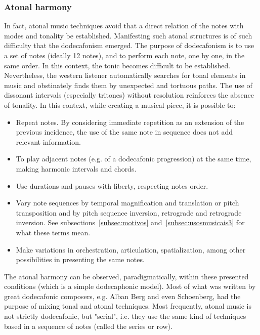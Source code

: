 \subsubsection{Atonal harmony}
In fact, atonal music techniques avoid that a direct relation of the notes with modes and tonality be established. Manifesting such atonal structures is of such difficulty that the dodecafonism emerged. The purpose of dodecafonism is to use a set of notes (ideally 12 notes), and to perform each note, one by one, in the same
order. In this context, the tonic becomes difficult to be established. Nevertheless, the western listener automatically searches for tonal elements in music and obstinately finds them by unexpected and tortuous paths. The use of dissonant intervals (especially tritones) without resolution reinforces the absence of tonality. In this context, while creating a musical
piece, it is possible to:
\begin{itemize}
     \item Repeat notes. By considering immediate repetition as an extension of the previous incidence, the use of the same note in sequence does not add relevant information.
     \item To play adjacent notes (e.g. of a dodecafonic progression) at the same time, making harmonic intervals and chords.
     \item Use durations and pauses with liberty, respecting notes order.
     \item Vary note sequences by temporal magnification and translation or pitch transposition and by pitch sequence inversion, retrograde and retrograde inversion. See subsections~\ref{subsec:motivos}
     and~\ref{subsec:usosmusicais3} for what these terms mean.
     \item Make variations in orchestration, articulation, spatialization, among other possibilities in presenting the same notes.
\end{itemize}

The atonal harmony can be observed, paradigmatically, within these presented conditions (which is a simple dodecaphonic model). Most of what was written by great dodecafonic composers,
e.g. Alban Berg and even Schoenberg, had the purpose of mixing tonal and atonal techniques.
Most frequently, atonal music is not strictly dodecafonic, but "serial", i.e. they use the same kind of techniques based in a sequence of notes (called the series or row).

